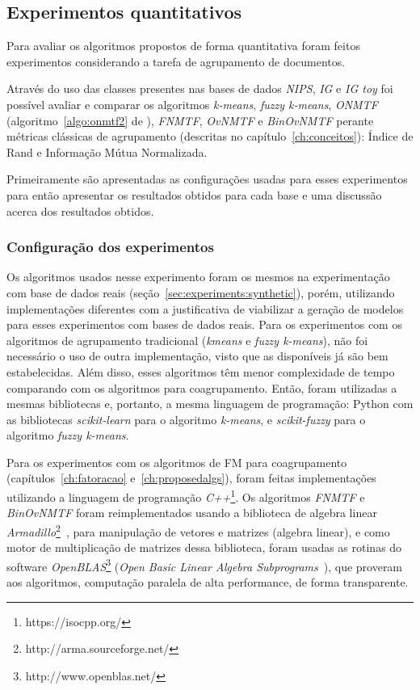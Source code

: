 \documentclass[
    12pt,                %
    oneside,            %
    a4paper,            %
    english,            %
    brazil                %
    ]{abntex2ppgsi}
\begin{document}
\subsection{Experimentos quantitativos}
\label{subsec:experiments-quant}

Para avaliar os algoritmos propostos de forma quantitativa foram feitos experimentos considerando a tarefa de agrupamento de documentos.

Através do uso das classes presentes nas bases de dados \textit{NIPS}, \textit{IG} e \textit{IG toy} foi possível avaliar e comparar os algoritmos \textit{k-means}, \textit{fuzzy k-means}, \textit{ONMTF} (algoritmo~\ref{algo:onmtf2} de ), \textit{FNMTF}, \textit{OvNMTF} e \textit{BinOvNMTF} perante métricas clássicas de agrupamento (descritas no capítulo~\ref{ch:conceitos}): Índice de Rand e Informação Mútua Normalizada.

Primeiramente são apresentadas as configurações usadas para esses experimentos para então apresentar os resultados obtidos para cada base e uma discussão acerca dos resultados obtidos.

\subsubsection{Configuração dos experimentos}

Os algoritmos usados nesse experimento foram os mesmos na experimentação com base de dados reais (seção~\ref{sec:experiments:synthetic}), porém, utilizando implementações diferentes com a justificativa de viabilizar a geração de modelos para esses experimentos com bases de dados reais.
Para os experimentos com os algoritmos de agrupamento tradicional (\textit{kmeans} e \textit{fuzzy k-means}), não foi necessário o uso de outra implementação, visto que as disponíveis já são bem estabelecidas.
Além disso, esses algoritmos têm menor complexidade de tempo comparando com os algoritmos para coagrupamento.
Então, foram utilizadas a mesmas bibliotecas e, portanto, a mesma linguagem de programação: Python com as bibliotecas \textit{scikit-learn} para o algoritmo \textit{k-means}, e \textit{scikit-fuzzy} para o algoritmo \textit{fuzzy k-means}.

Para os experimentos com os algoritmos de FM para coagrupamento (capítulos~\ref{ch:fatoracao} e~\ref{ch:proposedalgs}), foram feitas implementações utilizando a linguagem de programação \textit{C++}\footnote{https://isocpp.org/}.
Os algoritmos \textit{FNMTF} e \textit{BinOvNMTF} foram reimplementados usando a biblioteca de algebra linear \textit{Armadillo}\footnote{http://arma.sourceforge.net/}~\cite{armadillo}, para manipulação de vetores e matrizes (algebra linear), e como motor de multiplicação de matrizes dessa biblioteca, foram usadas as rotinas do software \textit{OpenBLAS}\footnote{http://www.openblas.net/} (\textit{Open Basic Linear Algebra Subprograms}~\cite{openblas}), que proveram aos algoritmos, computação paralela de alta performance, de forma transparente.
\end{document}
